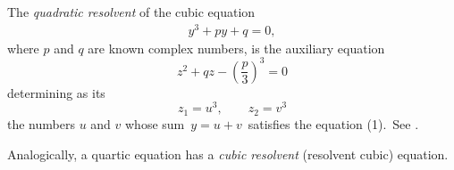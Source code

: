 \documentclass[12pt]{article}
\theoremstyle{definition}
\begin{document}
The {\em quadratic resolvent} of the cubic equation
\begin{align}
y^3+py+q = 0,
\end{align}
where $p$ and $q$ are known complex numbers, is the auxiliary equation
$$z^2+qz-\left(\frac{p}{3}\right)^3 = 0$$
determining as its 
$$z_1 = u^3, \qquad z_2 = v^3$$
the numbers $u$ and $v$ whose sum \,$y = u+v$\, satisfies the
equation (1).\, See 
.

Analogically, a quartic equation has a {\em cubic resolvent} (resolvent cubic) equation.
\end{document}
